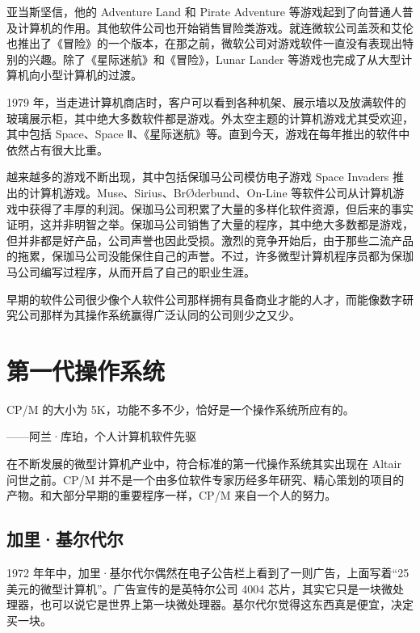 \documentclass[12pt,UTF8]{ctexbook}
\begin{document}
亚当斯坚信，他的 Adventure Land 和 Pirate Adventure 等游戏起到了向普通人普及计算机的作用。其他软件公司也开始销售冒险类游戏。就连微软公司盖茨和艾伦也推出了《冒险》的一个版本，在那之前，微软公司对游戏软件一直没有表现出特别的兴趣。除了《星际迷航》和《冒险》，Lunar Lander 等游戏也完成了从大型计算机向小型计算机的过渡。

1979 年，当走进计算机商店时，客户可以看到各种机架、展示墙以及放满软件的玻璃展示柜，其中绝大多数软件都是游戏。外太空主题的计算机游戏尤其受欢迎，其中包括 Space、Space Ⅱ、《星际迷航》等。直到今天，游戏在每年推出的软件中依然占有很大比重。

越来越多的游戏不断出现，其中包括保珈马公司模仿电子游戏 Space Invaders 推出的计算机游戏。Muse、Sirius、BrØderbund、On-Line 等软件公司从计算机游戏中获得了丰厚的利润。保珈马公司积累了大量的多样化软件资源，但后来的事实证明，这并非明智之举。保珈马公司销售了大量的程序，其中绝大多数都是游戏，但并非都是好产品，公司声誉也因此受损。激烈的竞争开始后，由于那些二流产品的拖累，保珈马公司没能保住自己的声誉。不过，许多微型计算机程序员都为保珈马公司编写过程序，从而开启了自己的职业生涯。

早期的软件公司很少像个人软件公司那样拥有具备商业才能的人才，而能像数字研究公司那样为其操作系统赢得广泛认同的公司则少之又少。





\section{第一代操作系统}


CP/M 的大小为 5K，功能不多不少，恰好是一个操作系统所应有的。

——阿兰·库珀，个人计算机软件先驱



在不断发展的微型计算机产业中，符合标准的第一代操作系统其实出现在 Altair 问世之前。CP/M 并不是一个由多位软件专家历经多年研究、精心策划的项目的产物。和大部分早期的重要程序一样，CP/M 来自一个人的努力。





\subsection{加里·基尔代尔}


1972 年年中，加里·基尔代尔偶然在电子公告栏上看到了一则广告，上面写着“25 美元的微型计算机”。广告宣传的是英特尔公司 4004 芯片，其实它只是一块微处理器，也可以说它是世界上第一块微处理器。基尔代尔觉得这东西真是便宜，决定买一块。
\end{document}

